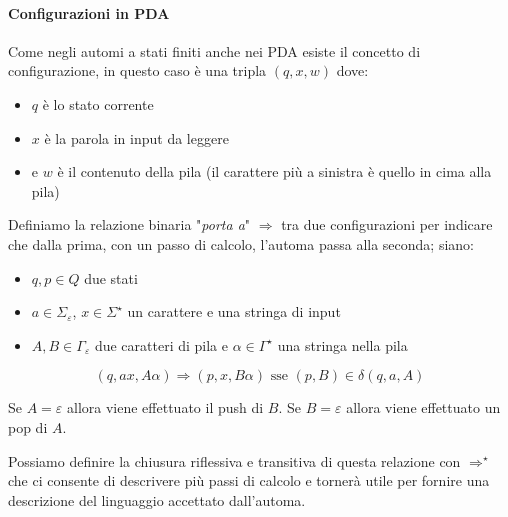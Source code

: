 \paragraph{Configurazioni in PDA}
Come negli automi a stati finiti anche nei PDA esiste il concetto di configurazione, in questo caso è una tripla $(q, x, w)$ dove:
\begin{itemize}
 \item  $q$ è lo stato corrente
 \item $x$ è la parola in input da leggere
 \item e $w$ è il contenuto della pila (il carattere più a sinistra è quello in cima alla pila)
 \end{itemize}
 Definiamo la relazione binaria "\textit{porta a}" $\Rightarrow$ tra due configurazioni per indicare che dalla prima, con un passo di calcolo, l'automa passa alla seconda; siano:
 \begin{itemize}
 \item $q, p \in Q$ due stati
 \item $a \in \Sigma_{\varepsilon}$, $x \in \Sigma^{\star}$ un carattere e una stringa di input
 \item $A, B \in \Gamma_{\varepsilon}$ due caratteri di pila e $\alpha \in \Gamma^{\star}$ una stringa nella pila 
 \end{itemize}
 $$(q, ax, A\alpha) \Rightarrow (p, x, B\alpha) \text{ sse } (p,B) \in \delta(q, a, A)$$
 
 Se $A = \varepsilon$ allora viene effettuato il push di $B$. Se $B = \varepsilon$ allora viene effettuato un pop di $A$.

Possiamo definire la chiusura riflessiva e transitiva di questa relazione con $\Rightarrow^{\star}$ che ci consente di descrivere più passi di calcolo e tornerà utile per fornire una descrizione del linguaggio accettato dall'automa.
